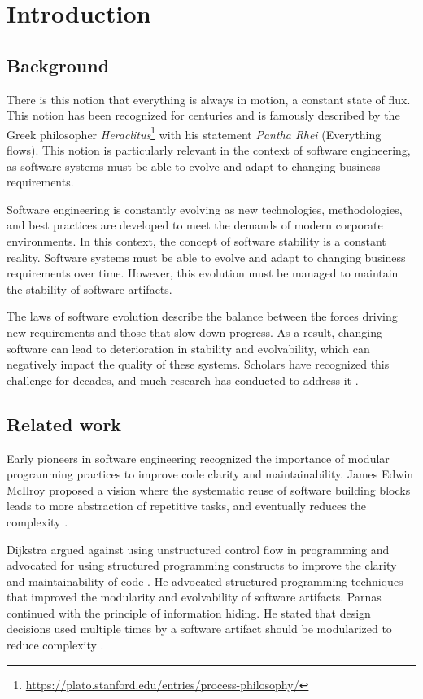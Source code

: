 \chapter{Introduction} \label{chap_introduction}

\section{Background} \label{sec_background} 

There is this notion that everything is always in motion, a constant state of flux. This
notion has been recognized for centuries and is famously described by the Greek
philosopher
\emph{Heraclitus}\footnote{\url{https://plato.stanford.edu/entries/process-philosophy/}}
with his statement \emph{Pantha Rhei} (Everything flows). This notion is particularly
relevant in the context of software engineering, as software systems must be able to
evolve and adapt to changing business requirements.

Software engineering is constantly evolving as new technologies, methodologies, and best
practices are developed to meet the demands of modern corporate environments. In this
context, the concept of software stability is a constant reality. Software systems must be
able to evolve and adapt to changing business requirements over time. However, this
evolution must be managed to maintain the stability of software artifacts.

The laws of software evolution describe the balance between the forces driving new
requirements and those that slow down progress. As a result, changing software can lead to
deterioration in stability and evolvability, which can negatively impact the quality of
these systems. Scholars have recognized this challenge for decades, and much research has
conducted to address it \parencite{lehman_programs_1980}.

\section{Related work} \label{sub:related_work}

Early pioneers in software engineering recognized the importance of modular programming
practices to improve code clarity and maintainability. James Edwin McIlroy proposed a
vision where the systematic reuse of software building blocks leads to more abstraction of
repetitive tasks, and eventually reduces the complexity \parencite[79]{p_naur_nato_1968}. 

Dijkstra argued against using unstructured control flow in programming and advocated for
using structured programming constructs to improve the clarity and maintainability of code
\parencite{dijkstra_letters_1968}. He advocated structured programming techniques that
improved the modularity and evolvability of software artifacts. Parnas continued with the
principle of information hiding. He stated that design decisions used multiple
times by a software artifact should be modularized to reduce complexity
\parencite{parnas_criteria_1972}. 


